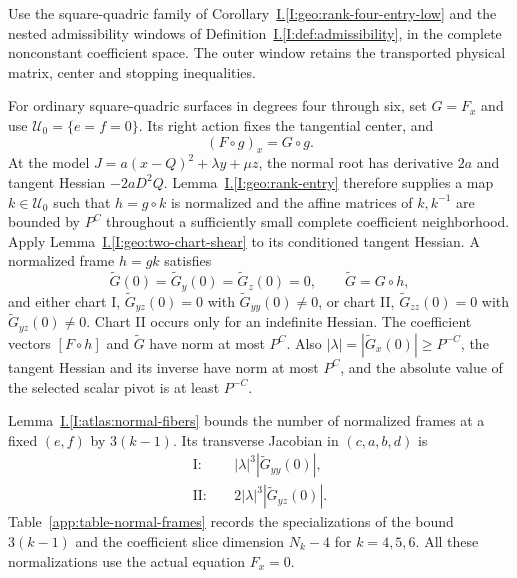 \documentclass[11pt]{amsart}
\makeatletter
\theoremstyle{definition}
\theoremstyle{remark}
\numberwithin{equation}{section}
\newcommand{\equationalias}[1]{\begingroup\protected@edef\@currentlabel{\p@equation\theequation}\protected@edef\@currentHref{equation.\theHequation}\label{#1}\endgroup}
\newcommand{\partIref}[1]{\hyperref[I:#1]{I.\ref*{I:#1}}}
\makeatother
\begin{document}
Use the square-quadric family of Corollary~\partIref{geo:rank-four-entry-low} and the nested admissibility windows of Definition~\partIref{def:admissibility}, in the complete nonconstant coefficient space. The outer window retains the transported physical matrix, center and stopping inequalities.

For ordinary square-quadric surfaces in degrees four through six, set $G=F_x$ and use $\mathcal U_0=\{e=f=0\}$. Its right action fixes the tangential center, and
\begin{equation}\label{low:4:sf:eq:covariance}
(F\circ g)_x=G\circ g.
\end{equation}
\equationalias{low:6:qsf:eq:covariance}
At the model $J=a(x-Q)^2+\lambda y+\mu z$, the normal root has derivative $2a$ and tangent Hessian $-2aD^2Q$. Lemma~\partIref{geo:rank-entry} therefore supplies a map $k\in\mathcal U_0$ such that $h=g\circ k$ is normalized and the affine matrices of $k,k^{-1}$ are bounded by $P^C$ throughout a sufficiently small complete coefficient neighborhood. Apply Lemma~\partIref{geo:two-chart-shear} to its conditioned tangent Hessian. A normalized frame $h=gk$ satisfies
\begin{equation}\label{low:4:sf:eq:normalized}
\widetilde G(0)=\widetilde G_y(0)=\widetilde G_z(0)=0,\qquad \widetilde G=G\circ h,
\end{equation}
\equationalias{low:6:qsf:eq:normalized}
and either chart I, $\widetilde G_{yz}(0)=0$ with $\widetilde G_{yy}(0)\ne0$, or chart II, $\widetilde G_{zz}(0)=0$ with $\widetilde G_{yz}(0)\ne0$. Chart II occurs only for an indefinite Hessian. The coefficient vectors $[F\circ h]$ and $\widetilde G$ have norm at most $P^C$. Also $|\lambda|=|\widetilde G_x(0)|\ge P^{-C}$, the tangent Hessian and its inverse have norm at most $P^C$, and the absolute value of the selected scalar pivot is at least $P^{-C}$.

Lemma~\partIref{atlas:normal-fibers} bounds the number of normalized frames at a fixed $(e,f)$ by $3(k-1)$. Its transverse Jacobian in $(c,a,b,d)$ is
\begin{align}
\mathrm{I}:&\quad |\lambda|^3|\widetilde G_{yy}(0)|,\label{low:4:sf:eq:jacI}\\
\mathrm{II}:&\quad 2|\lambda|^3|\widetilde G_{yz}(0)|.\label{low:4:sf:eq:jacII}
\end{align}
Table~\ref{app:table-normal-frames} records the specializations of the bound $3(k-1)$ and the coefficient slice dimension $N_k-4$ for $k=4,5,6$. All these normalizations use the actual equation $F_x=0$.
\end{document}
